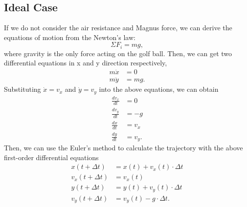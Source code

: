 \documentclass[a4paper]{article}
\begin{document}
	\subsection{Ideal Case}
	If we do not consider the air resistance and Magnus force, we can derive the equations of motion from the Newton's law:
	\begin{equation}
		\Sigma F_i = mg,
	\end{equation}
	where gravity is the only force acting on the golf ball.
	Then, we can get two differential equations in x and y direction respectively,
	\begin{align}
		m\ddot{x} &= 0 \\
		m\ddot{y} &= mg. \nonumber 
	\end{align}
	Substituting $\dot{x} = v_x$ and $\dot{y} = v_y$ into the above equations, we can obtain
	\begin{align} 
		\frac{dv_x}{dt} &= 0 \\
		\frac{dv_y}{dt} &= -g\nonumber \\
		\frac{dx}{dt} &= v_x\nonumber  \\
		\frac{dy}{dt} &= v_y.\nonumber 
	\end{align}
	Then, we can use the Euler's method to calculate the trajectory with the above first-order differential equations
	\begin{align} \label{ideal}
		x(t + \Delta t) &= x(t) + v_x(t)\cdot\Delta t \\
		v_x (t + \Delta t) &= v_x(t)\nonumber  \\
		y(t + \Delta t) &= y(t) + v_y(t)\cdot\Delta t\nonumber \\
		v_y(t + \Delta t) &= v_y(t) - g\cdot \Delta t. \nonumber 
	\end{align}
	
\end{document}
